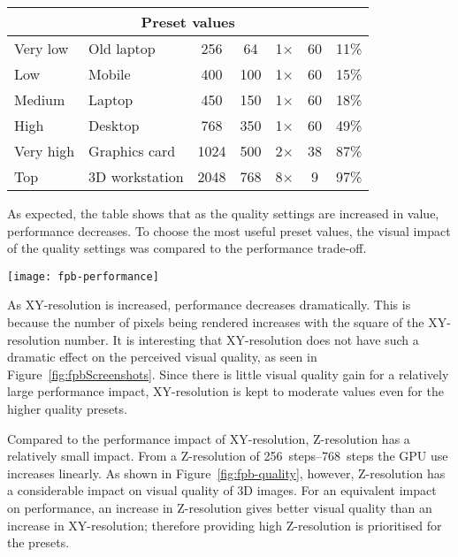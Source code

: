 \begin{table}
\begin{tabular}{|l l|c c c|c c|}
\multicolumn{7}{|c|}{\textbf{Preset values}} \\ \hline
Very low & Old laptop & 256 & 64 & 1$\times$ & 60 & 11\% \\
Low & Mobile & 400 & 100 & 1$\times$ & 60 & 15\% \\
Medium & Laptop & 450 & 150 & 1$\times$ & 60 & 18\% \\
High & Desktop & 768 & 350 & 1$\times$ & 60 & 49\% \\
Very high & Graphics card & 1024 & 500 & 2$\times$ & 38 & 87\% \\
Top & 3D workstation & 2048 & 768 & 8$\times$ & 9 & 97\% \\
\hline

\end{tabular}
\end{table}

As expected, the table shows that as the quality settings are increased in value, performance decreases.
To choose the most useful preset values, the visual impact of the quality settings was compared to the performance trade-off.

\begin{sidewaysfigure}[p]
\centering
\texttt{[image: fpb-performance]}
\caption[FPBioimage: Adjustable quality settings allow FPBioimage to be used on a range of devices]{The figure shows FPBioimage rendering with different quality presets: (a) Low; (b) Medium; (c) High; and (d) Top. The highest quality levels are designed for use on a high-end desktop computer; lower quality settings are provided to allow FPBioiamge to run on mobile devices. Performance was measured using frames per second (FPS) and graphics card percentage usage, shown on the screenshots. Results from these tests are presented in Table~\ref{tab:fpbPerformance}. The CT scan of a human head is from the Stanford Volumetric Data Archive~\cite{levoy1988volume}. }
\label{fig:fpb-quality}
\end{sidewaysfigure}

As XY-resolution is increased, performance decreases dramatically.
This is because the number of pixels being rendered increases with the square of the XY-resolution number.
It is interesting that XY-resolution does not have such a dramatic effect on the perceived visual quality, as seen in Figure~\ref{fig:fpbScreenshots}.
Since there is little visual quality gain for a relatively large performance impact, XY-resolution is kept to moderate values even for the higher quality presets.

Compared to the performance impact of XY-resolution, Z-resolution has a relatively small impact.
From a Z-resolution of \SIrange{256}{768}{steps} the GPU use increases linearly.
As shown in Figure~\ref{fig:fpb-quality}, however, Z-resolution has a considerable impact on visual quality of 3D images.
For an equivalent impact on performance, an increase in Z-resolution gives better visual quality than an increase in XY-resolution; therefore providing high Z-resolution is prioritised for the presets.

